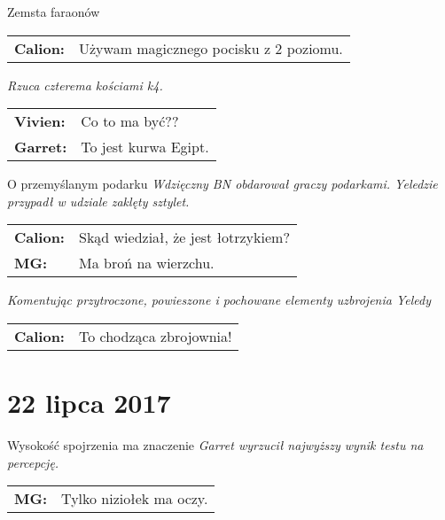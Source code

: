 \documentclass[10pt,twoside,twocolumn]{book}
\begin{document}
\begin{rpg-quotebox}{Zemsta faraonów}
   \begin{tabularx}{\columnwidth}{lX}
      \textbf{Calion:} & Używam magicznego pocisku z 2 poziomu.\\ 
   \end{tabularx}

   \vskip0.15cm
   \textit{Rzuca czterema kościami k4.} \\
   
   \begin{tabularx}{\columnwidth}{lX}
      \textbf{Vivien:} & Co to ma być??\\
      \textbf{Garret:} & To jest kurwa Egipt.
   \end{tabularx}
\end{rpg-quotebox}


\begin{rpg-quotebox}{O przemyślanym podarku}
   \textit{Wdzięczny BN obdarował graczy podarkami. Yeledzie przypadł w udziale zaklęty sztylet.}\\
   
   \begin{tabularx}{\columnwidth}{lX}
      \textbf{Calion:} & Skąd wiedział, że jest łotrzykiem?\\
      \textbf{MG:} & Ma broń na wierzchu.\\
   \end{tabularx}
   \newline

   \textit{Komentując przytroczone, powieszone i pochowane elementy uzbrojenia Yeledy} \\
   
   \begin{tabularx}{\columnwidth}{lX}
      \textbf{Calion:} & To chodząca zbrojownia!\\
   \end{tabularx}
\end{rpg-quotebox}


\section*{22 lipca 2017}


\begin{rpg-quotebox}{Wysokość spojrzenia ma znaczenie}
   \textit{Garret wyrzucił najwyższy wynik testu na percepcję.} \\

   \begin{tabularx}{\columnwidth}{lX}
      \textbf{MG:} & Tylko niziołek ma oczy.\\
   \end{tabularx}
\end{rpg-quotebox}
\end{document}
